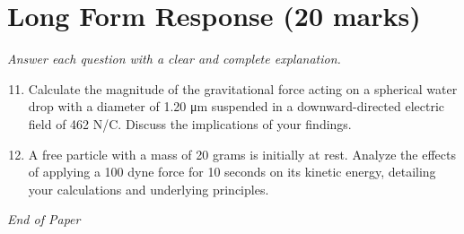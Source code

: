 \documentclass[12pt]{article}
\begin{document}
\section*{Long Form Response (20 marks)}
\textit{Answer each question with a clear and complete explanation.}
\begin{enumerate}[label=\arabic*.]
\setcounter{enumi}{10}
\item Calculate the magnitude of the gravitational force acting on a spherical water drop with a diameter of 1.20 μm suspended in a downward-directed electric field of 462 N/C. Discuss the implications of your findings.
\item A free particle with a mass of 20 grams is initially at rest. Analyze the effects of applying a 100 dyne force for 10 seconds on its kinetic energy, detailing your calculations and underlying principles.
\end{enumerate}

\vfill
\noindent\textit{End of Paper}
\end{document}
